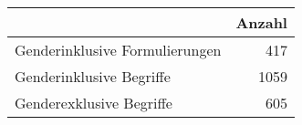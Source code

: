 
\begin{tabular}{l|r}
\hline
 & Anzahl\\
\hline
Genderinklusive Formulierungen & 417\\
Genderinklusive Begriffe & 1059\\
Genderexklusive Begriffe & 605\\
\hline
\end{tabular}